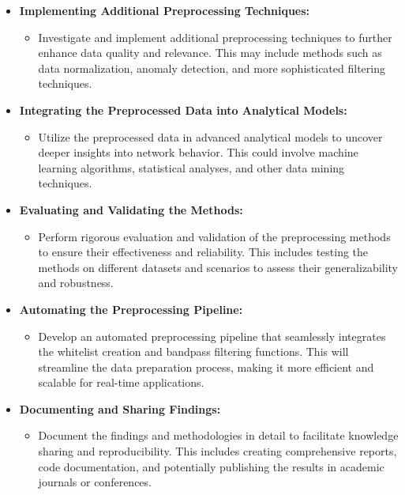 \begin{itemize}
    \item \textbf{Implementing Additional Preprocessing Techniques:}
    \begin{itemize}
        \item Investigate and implement additional preprocessing techniques to further enhance data quality and relevance. This may include methods such as data normalization, anomaly detection, and more sophisticated filtering techniques.
    \end{itemize}
    \item \textbf{Integrating the Preprocessed Data into Analytical Models:}
    \begin{itemize}
        \item Utilize the preprocessed data in advanced analytical models to uncover deeper insights into network behavior. This could involve machine learning algorithms, statistical analyses, and other data mining techniques.
    \end{itemize}
    \item \textbf{Evaluating and Validating the Methods:}
    \begin{itemize}
        \item Perform rigorous evaluation and validation of the preprocessing methods to ensure their effectiveness and reliability. This includes testing the methods on different datasets and scenarios to assess their generalizability and robustness.
    \end{itemize}
    \item \textbf{Automating the Preprocessing Pipeline:}
    \begin{itemize}
        \item Develop an automated preprocessing pipeline that seamlessly integrates the whitelist creation and bandpass filtering functions. This will streamline the data preparation process, making it more efficient and scalable for real-time applications.
    \end{itemize}
    \item \textbf{Documenting and Sharing Findings:}
    \begin{itemize}
        \item Document the findings and methodologies in detail to facilitate knowledge sharing and reproducibility. This includes creating comprehensive reports, code documentation, and potentially publishing the results in academic journals or conferences.
    \end{itemize}
\end{itemize}

